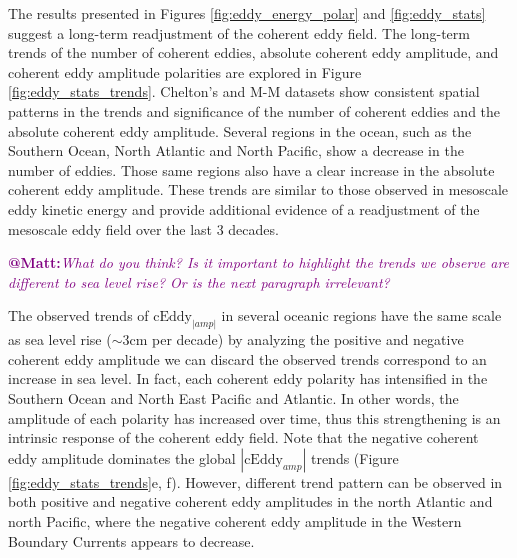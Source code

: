 \documentclass[draft,linenumbers]{agujournal2019}
\newcommand{\cEddy}{\textrm{cEddy}}
\begin{document}
	The results presented in Figures \ref{fig:eddy_energy_polar} and \ref{fig:eddy_stats} suggest a long-term readjustment of the coherent eddy field. 
	The long-term trends of the number of coherent eddies, absolute coherent eddy amplitude, and coherent eddy amplitude polarities are explored in Figure \ref{fig:eddy_stats_trends}. 
	Chelton's and M-M datasets show consistent spatial patterns in the trends and significance of the number of coherent eddies and the absolute coherent eddy amplitude. 
	Several regions in the ocean, such as the Southern Ocean, North Atlantic and North Pacific, show a decrease in the number of eddies. Those same regions also have a clear increase in the absolute coherent eddy amplitude. 
	These trends are similar to those observed in mesoscale eddy kinetic energy \citep{Martinez_Kinetic_2021} and provide additional evidence of a readjustment of the mesoscale eddy field over the last 3 decades. 
	
	\textcolor{purple}{\textbf{@Matt:}\textit{What do you think? Is it important to highlight the trends we observe are different to sea level rise? Or is the next paragraph irrelevant?}}

	The observed trends of $\cEddy_{|amp|}$ in several oceanic regions have the same scale as sea level rise ($\sim$3cm per decade) by analyzing the positive and negative coherent eddy amplitude we can discard the observed trends correspond to an increase in sea level. 
	In fact, each coherent eddy polarity has intensified in the Southern Ocean and North East Pacific and Atlantic. 
	In other words, the amplitude of each polarity has increased over time, thus this strengthening is an intrinsic response of the coherent eddy field. Note that the negative coherent eddy amplitude dominates the global $|\cEddy_{amp}|$ trends (Figure \ref{fig:eddy_stats_trends}e, f). However, different trend pattern can be observed in both positive and negative coherent eddy amplitudes in the north Atlantic and north Pacific, where the negative coherent eddy amplitude in the  Western Boundary Currents appears to decrease.
\end{document}
